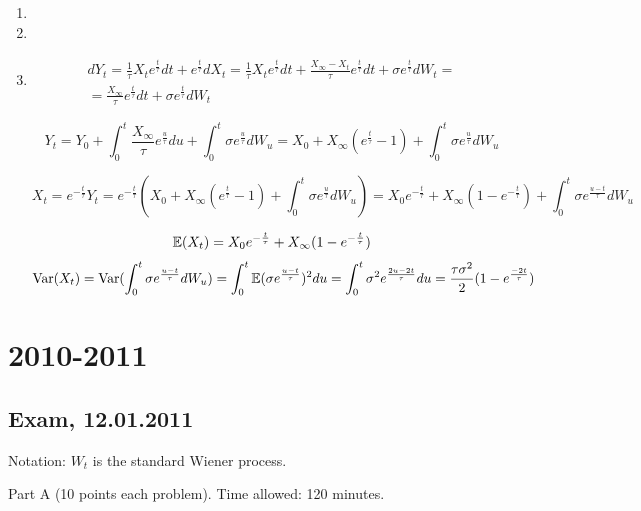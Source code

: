 \documentclass[12pt, a4paper]{article}
\begin{document}
\begin{enumerate}
\item

\item

\item

\begin{multline*}
dY_t=\frac{1}{\tau}X_t e^{\frac{t}{\tau}}dt+ e^{\frac{t}{\tau}}dX_t=
\frac{1}{\tau}X_t e^{\frac{t}{\tau}}dt+\frac{X_{\infty}-X_t}{\tau} e^{\frac{t}{\tau}}dt+ \sigma e^{\frac{t}{\tau}}dW_t=\\
=\frac{X_{\infty}}{\tau} e^{\frac{t}{\tau}}dt+ \sigma e^{\frac{t}{\tau}}dW_t
\end{multline*}

\[
Y_t=Y_0+\int_0^{t} \frac{X_{\infty}}{\tau} e^{\frac{u}{\tau}}du+\int_0^{t} \sigma e^{\frac{u}{\tau}}dW_u=
X_0+X_{\infty}(e^{\frac{t}{\tau}}-1)+\int_0^{t} \sigma e^{\frac{u}{\tau}}dW_u
\]

\[
X_t=e^{-\frac{t}{\tau}}Y_t= e^{-\frac{t}{\tau}} (X_0+X_{\infty}(e^{\frac{t}{\tau}}-1)+\int_0^{t} \sigma e^{\frac{u}{\tau}}dW_u) =X_0 e^{-\frac{t}{\tau}} +X_{\infty}(1- e^{-\frac{t}{\tau}})+\int_0^{t} \sigma e^{\frac{u-t}{\tau}}dW_u
\]


\[
\operatorname{\mathbb{E}}(X_t)= X_0 e^{-\frac{t}{\tau}} +X_{\infty}(1- e^{-\frac{t}{\tau}})
\]
\[
\operatorname{Var}(X_t)= \operatorname{Var}( \int_0^{t} \sigma e^{\frac{u-t}{\tau}}dW_u )=\int_0^{t} \operatorname{\mathbb{E}} (\sigma e^{\frac{u-t}{\tau}})^2du = \int_0^{t}\sigma^2 e^{\frac{2u-2t}{\tau}}du=\frac{\tau \sigma^2}{2} (1- e^{\frac{-2t}{\tau}})
\]

\end{enumerate}

\section{2010-2011}


\subsection{Exam, 12.01.2011}

Notation: $W_t$ is the standard Wiener process.


Part A (10 points each problem). Time allowed: 120 minutes.
\end{document}
